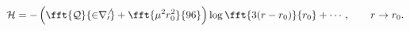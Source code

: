 \begin{equation}
{\cal H}=-\left(\fft{\cal Q}{2r_0^6}+\fft{\mu^2r_0^2}{96}\right)
\log\fft{3(r-r_0)}{r_0}+\cdots,\qquad r\to r_0.
\end{equation}

